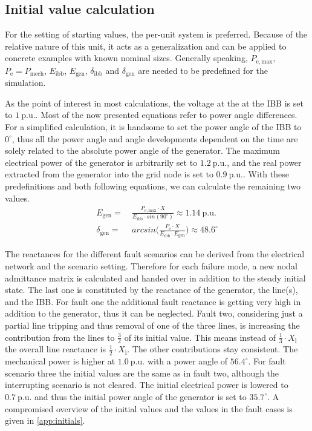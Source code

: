 \subsection{Initial value calculation}
\label{sec:initials}

For the setting of starting values, the per-unit system is preferred. Because of the relative nature of this unit, it acts as a generalization and can be applied to concrete examples with known nominal sizes. Generally speaking, $P_\mathrm{e,max}$, $P_\mathrm{e}=P_\mathrm{mech}$, $E_\mathrm{ibb}$, $E_\mathrm{gen}$, $\delta_\mathrm{ibb}$ and $\delta_\mathrm{gen}$ are needed to be predefined for the simulation. 

As the point of interest in most calculations, the voltage at the at the \acs{IBB} is set to $1~\mathrm{p.u.}$. Most of the now presented equations refer to power angle differences. For a simplified calculation, it is handsome to set the power angle of the \acs{IBB} to $0^\circ$, thus all the power angle and angle developments dependent on the time are solely related to the absolute power angle of the generator. The maximum electrical power of the generator is arbitrarily set to $1.2~\mathrm{p.u.}$, and the real power extracted from the generator into the grid node is set to $0.9~\mathrm{p.u.}$. With these predefinitions and both following equations, we can calculate the remaining two values.
\begin{align}
        E_\mathrm{gen}=&~\frac{P_\mathrm{e,max} \cdot X}{E_\mathrm{ibb} \cdot sin(90^\circ)} \approx 1.14~\mathrm{p.u.} \nonumber \\[6pt]
        \delta_\mathrm{gen}=&~arcsin\Bigg(\frac{P_\mathrm{e} \cdot X}{E_\mathrm{ibb} \cdot E_\mathrm{gen}}\Bigg) \approx 48.6^\circ \nonumber
\end{align}

The reactances for the different fault scenarios can be derived from the electrical network and the scenario setting. Therefore for each failure mode, a new nodal admittance matrix is calculated and handed over in addition to the steady initial state. The last one is constituted by the reactance of the generator, the line(s), and the \acs{IBB}. For fault one the additional fault reactance is getting very high in addition to the generator, thus it can be neglected. Fault two, considering just a partial line tripping and thus removal of one of the three lines, is increasing the contribution from the lines to $\frac{3}{2}$ of its initial value. This means instead of $\frac{1}{3} \cdot X_\mathrm{l}$ the overall line reactance is $\frac{1}{2} \cdot X_\mathrm{l}$. The other contributions stay consistent. The mechanical power is higher at $1.0~\mathrm{p.u.}$ with a power angle of $56.4^\circ$. For fault scenario three the initial values are the same as in fault two, although the interrupting scenario is not cleared. The initial electrical power is lowered to $0.7~\mathrm{p.u.}$ and thus the initial power angle of the generator is set to $35.7^\circ$. A compromised overview of the initial values and the values in the fault cases is given in \autoref{app:initials}.

